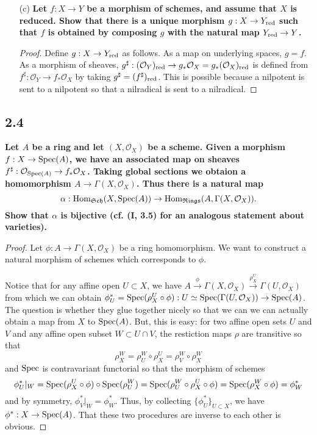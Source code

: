 \documentclass[11pt]{amsart}          %
\newcommand{\calO}{\mathcal{O}}
\newcommand{\spec}{{\rm Spec}}
\renewcommand{\hom}{{\rm Hom}}
\begin{document}
\begin{enumerate}
\item [(c)] \textbf{Let $f: X \to Y$ be a morphism of schemes, and assume that $X$ is reduced. Show that there is a unique morphism $g: X \to Y_{{\rm red}}$ such that $f$ is obtained by composing $g$ with the natural map $Y_{{\rm red}} \to Y$.}

\begin{proof}Define $g: X \to Y_{\rm red}$ as follows. As a map on underlying spaces, $g = f$. As a morphism of sheaves, $g^{\sharp}: (\calO_Y)_{\rm red} \to g_* \calO_X = g_* (\calO_X)_{\rm red}$ is defined from $f^{\sharp}: \calO_Y \to f_* \calO_X$ by taking $g^{\sharp} = (f^{\sharp})_{\rm red}$. This is possible because a nilpotent is sent to a nilpotent so that a nilradical is sent to a nilradical.\end{proof}
\end{enumerate}

\subsection*{2.4}\textbf{Let $A$ be a ring and let $(X, \calO_X)$ be a scheme. Given a morphism $f: X \to \spec (A)$, we have an associated map on sheaves $f^{\sharp} : \calO_{\spec (A)} \to f_* \calO_X$. Taking global sections we obtaion a homomorphism $A \to \Gamma(X, \calO_X)$. Thus there is a natural map 
$$ \alpha: \hom _{\mathfrak{Sch}} (X, \spec (A) ) \to \hom_{\mathfrak{Rings}} (A, \Gamma (X, \calO_X)).$$ Show that $\alpha$ is bijective (cf. (I, 3.5) for an analogous statement about varieties). }

\begin{proof}Let $\phi: A \to \Gamma(X, \calO_X)$ be a ring homomorphism. We want to construct a natural morphism of schemes which corresponds to $\phi$. 

Notice that for any affine open $U \subset X$, we have $A \overset{\phi}{\to} \Gamma(X, \calO_X) \overset{\rho^U _X}{\to} \Gamma(U, \calO_X)$ from which we can obtain $\phi_U ^* = \spec (\rho_X ^U \circ \phi): U \simeq \spec (\Gamma (U, \calO_X)) \to \spec(A)$. The question is whether they glue together nicely so that we can we can actually obtain a map from $X$ to $\spec (A)$. But, this is easy: for two affine open sets $U$ and $V$ and any affine open subset $W \subset U \cap V$, the restiction maps $\rho$ are transitive so that
$$\rho_X ^W =\rho_U ^W \circ \rho_X ^{U} = \rho_V ^W \circ \rho _X ^W$$
and $\spec$ is contravariant functorial so that the morphism of schemes $$\phi_U ^* |_W  = \spec( \rho_X ^U \circ \phi)\circ \spec(\rho_U ^W) = \spec(\rho_U ^W \circ \rho_X ^U \circ \phi) = \spec (\rho_X ^W \circ \phi) = \phi_W ^*$$ and by symmetry, $\phi_V ^* |_W = \phi_W ^*$. Thus, by collecting $\{ \phi_U^*\} _{U \subset X}$, we have $\phi^* : X \to \spec (A)$. That these two procedures are inverse to each other is obvious.\end{proof}
\end{document}
